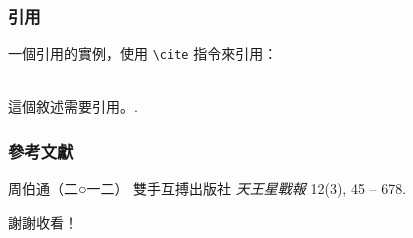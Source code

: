 \documentclass[hyperref={bookmarks=false}]{beamer}
\begin{document}

\begin{frame}[fragile] %
\frametitle{\iyan 引用}
一個引用的實例，使用 \verb|\cite| 指令來引用：\\~

這個敘述需要引用。\cite{p1}.
\end{frame}


\begin{frame}
\frametitle{\iyan 參考文獻}
\footnotesize{
\begin{thebibliography}{99} %
 周伯通（二○一二）
\newblock 雙手互搏出版社
\newblock \emph{天王星戰報} 12(3), 45 -- 678.
\end{thebibliography}
}
\end{frame}


\begin{frame}
\Huge{\centerline{\iyan 謝謝收看！}}
\end{frame}

\end{document}

